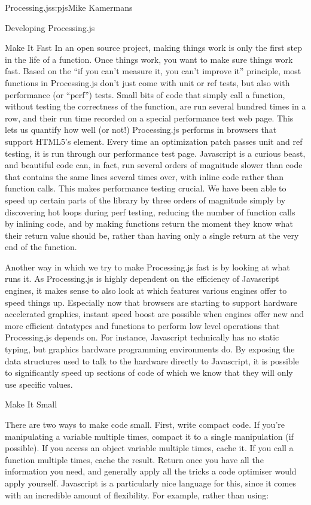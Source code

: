 \begin{aosachapter}{Processing.js}{s:pjs}{Mike Kamermans}
\begin{aosasect1}{Developing Processing.js}
\begin{aosasect2}{Make It Fast}
In an open source project, making things work is only the first step
in the life of a function. Once things work, you want to make sure
things work fast. Based on the ``if you can't measure it, you can't
improve it'' principle, most functions in Processing.js don't just come
with unit or ref tests, but also with performance (or ``perf'')
tests. Small bits of code that simply call a function, without testing
the correctness of the function, are run several hundred times in a
row, and their run time recorded on a special performance test web
page. This lets us quantify how well (or not!) Processing.js performs
in browsers that support HTML5's
 element. Every time an
optimization patch passes unit and ref testing, it is run through our
performance test page. Javascript is a curious beast, and beautiful
code can, in fact, run several orders of magnitude slower than code
that contains the same lines several times over, with inline code
rather than function calls. This makes performance testing crucial. We
have been able to speed up certain parts of the library by three
orders of magnitude simply by discovering hot loops during perf
testing, reducing the number of function calls by inlining code, and
by making functions return the moment they know what their return
value should be, rather than having only a single return at the very
end of the function.

Another way in which we try to make Processing.js fast is by looking
at what runs it. As Processing.js is highly dependent on the
efficiency of Javascript engines, it makes sense to also look at which
features various engines offer to speed things up. Especially now that
browsers are starting to support hardware accelerated graphics,
instant speed boost are possible when engines offer new and more
efficient datatypes and functions to perform low level operations that
Processing.js depends on. For instance, Javascript technically has no
static typing, but graphics hardware programming environments do. By
exposing the data structures used to talk to the hardware directly to
Javascript, it is possible to significantly speed up sections of code
of which we know that they will only use specific values.

\end{aosasect2}

\begin{aosasect2}{Make It Small}

There are two ways to make code small. First, write compact code. If
you're manipulating a variable multiple times, compact it to a single
manipulation (if possible). If you access an object variable multiple
times, cache it. If you call a function multiple times, cache the
result. Return once you have all the information you need, and
generally apply all the tricks a code optimiser would apply
yourself. Javascript is a particularly nice language for this, since
it comes with an incredible amount of flexibility. For example, rather
than using:


\end{aosasect2}
\end{aosasect1}
\end{aosachapter}
